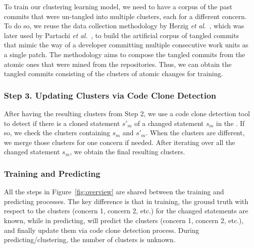  To train our clustering learning
model, we need to have a corpus of the past commits that were
un-tangled into multiple clusters, each for a different concern. To do
so, we reuse the data collection methodology by Herzig {\em et
  al.}~\cite{kim-emse16}, which was later used by Partachi {\em et
  al.}~\cite{flexeme-fse20}, to build the artificial corpus of tangled
commits that mimic the way of a developer committing multiple
consecutive work units as a single patch. The methodology aims to
compose the tangled commits from the atomic ones that were mined from
the repositories. Thus, we can obtain the tangled commits consisting
of the clusters of atomic changes for training.




\subsubsection{{\bf Step 3. Updating Clusters via Code Clone Detection}}

After having the resulting clusters from Step 2, we use a code clone
detection tool to detect if there is a cloned statement $s'_m$ of a
changed statement $s_m$ in the {\mvpdg}. If so, we check the clusters
containing $s_m$ and $s'_m$. When the clusters are different, we merge
those clusters for one concern if needed. After iterating over all the
changed statement $s_m$, we obtain the final resulting clusters.


\subsubsection*{Training and Predicting}
All the steps in Figure~\ref{fig:overview} are shared between the
training and predicting processes. The key difference is that in
training, the ground truth with respect to the clusters (concern 1,
concern 2, etc.) for the changed statements are known, while in
predicting, {\tool} will predict the clusters (concern 1, concern 2,
etc.), and finally update them via code clone detection process. During
predicting/clustering, the number of clusters is unknown.

